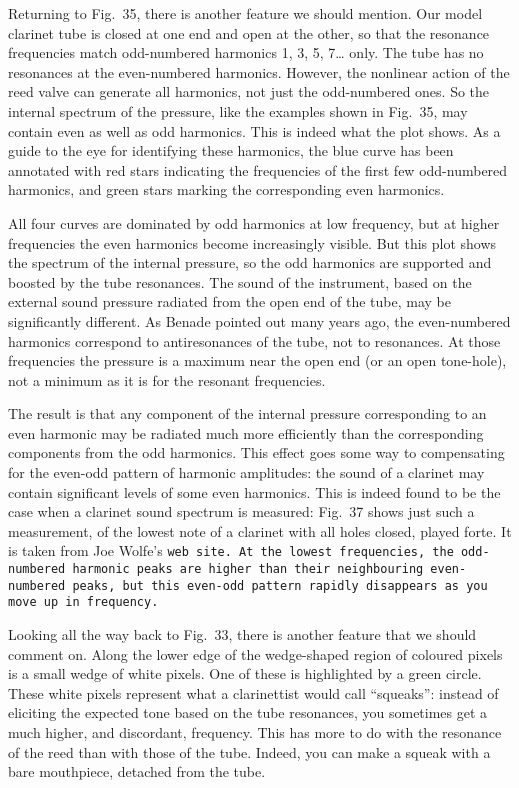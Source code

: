   Returning to Fig.\ 35, there is another feature we should mention. Our model 
  clarinet tube is closed at one end and open at the other, so that the 
  resonance frequencies match odd-numbered harmonics 1, 3, 5, 7… only. The tube 
  has no resonances at the even-numbered harmonics. However, the nonlinear 
  action of the reed valve can generate all harmonics, not just the 
  odd-numbered ones. So the internal spectrum of the pressure, like the 
  examples shown in Fig.\ 35, may contain even as well as odd harmonics. This 
  is indeed what the plot shows. As a guide to the eye for identifying these 
  harmonics, the blue curve has been annotated with red stars indicating the 
  frequencies of the first few odd-numbered harmonics, and green stars marking 
  the corresponding even harmonics. 

  All four curves are dominated by odd harmonics at low frequency, but at 
  higher frequencies the even harmonics become increasingly visible. But this 
  plot shows the spectrum of the internal pressure, so the odd harmonics are 
  supported and boosted by the tube resonances. The sound of the instrument, 
  based on the external sound pressure radiated from the open end of the tube, 
  may be significantly different. As Benade pointed out many years ago, the 
  even-numbered harmonics correspond to antiresonances of the tube, not to 
  resonances. At those frequencies the pressure is a maximum near the open end 
  (or an open tone-hole), not a minimum as it is for the resonant frequencies. 

  The result is that any component of the internal pressure corresponding to an 
  even harmonic may be radiated much more efficiently than the corresponding 
  components from the odd harmonics. This effect goes some way to compensating 
  for the even-odd pattern of harmonic amplitudes: the sound of a clarinet may 
  contain significant levels of some even harmonics. This is indeed found to be 
  the case when a clarinet sound spectrum is measured: Fig.\ 37 shows just such 
  a measurement, of the lowest note of a clarinet with all holes closed, played 
  forte. It is taken from Joe Wolfe's \tt{}web site\rm{}. At the lowest 
  frequencies, the odd-numbered harmonic peaks are higher than their 
  neighbouring even-numbered peaks, but this even-odd pattern rapidly 
  disappears as you move up in frequency. 

  Looking all the way back to Fig.\ 33, there is another feature that we should 
  comment on. Along the lower edge of the wedge-shaped region of coloured 
  pixels is a small wedge of white pixels. One of these is highlighted by a 
  green circle. These white pixels represent what a clarinettist would call 
  “squeaks”: instead of eliciting the expected tone based on the tube 
  resonances, you sometimes get a much higher, and discordant, frequency. This 
  has more to do with the resonance of the reed than with those of the tube. 
  Indeed, you can make a squeak with a bare mouthpiece, detached from the tube. 

